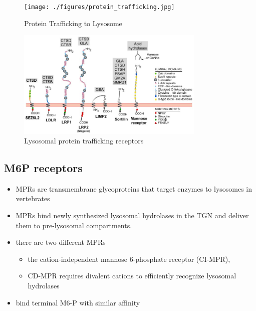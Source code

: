 \documentclass{scrartcl}
\begin{document}
\begin{figure}[htbp]
\centering
\texttt{[image: ./figures/protein\_trafficking.jpg]}
\caption{\label{fig:org8e7fd99}
Protein Trafficking to Lysosome}
\end{figure}

\begin{figure}[htbp]
\centering
\includegraphics[width=0.8\textwidth]{./figures/lysosome_trafficking.jpeg}
\caption[Lysosomal protein trafficking receptors]{\label{fig:orgf34f871}
Lysosomal protein trafficking receptors}
\end{figure}

\subsection{M6P receptors}
\label{sec:org24f138e}
\begin{itemize}
\item MPRs are transmembrane glycoproteins that target enzymes to lysosomes in vertebrates
\item MPRs bind newly synthesized lysosomal hydrolases in the TGN and deliver them to pre-lysosomal compartments.
\item there are two different MPRs
\begin{itemize}
\item the cation-independent mannose 6-phosphate receptor (CI-MPR),
\item CD-MPR requires divalent cations to efficiently recognize lysosomal hydrolases
\end{itemize}
\item bind terminal M6-P with similar affinity
\end{itemize}
\end{document}
